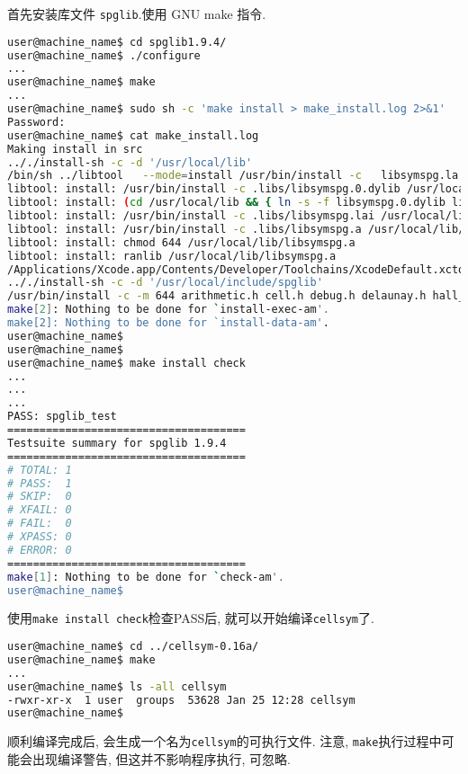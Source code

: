 \documentclass[a4paper, 10pt]{article}
\begin{document}
\begin{description}
首先安装库文件 \verb|spglib|.使用 GNU make 指令. 
\begin{lstlisting}[language={bash}]
user@machine_name$ cd spglib1.9.4/
user@machine_name$ ./configure
...
user@machine_name$ make
...
user@machine_name$ sudo sh -c 'make install > make_install.log 2>&1'
Password:
user@machine_name$ cat make_install.log 
Making install in src
.././install-sh -c -d '/usr/local/lib'
/bin/sh ../libtool   --mode=install /usr/bin/install -c   libsymspg.la '/usr/local/lib'
libtool: install: /usr/bin/install -c .libs/libsymspg.0.dylib /usr/local/lib/libsymspg.0.dylib
libtool: install: (cd /usr/local/lib && { ln -s -f libsymspg.0.dylib libsymspg.dylib || { rm -f libsymspg.dylib && ln -s libsymspg.0.dylib libsymspg.dylib; }; })
libtool: install: /usr/bin/install -c .libs/libsymspg.lai /usr/local/lib/libsymspg.la
libtool: install: /usr/bin/install -c .libs/libsymspg.a /usr/local/lib/libsymspg.a
libtool: install: chmod 644 /usr/local/lib/libsymspg.a
libtool: install: ranlib /usr/local/lib/libsymspg.a
/Applications/Xcode.app/Contents/Developer/Toolchains/XcodeDefault.xctoolchain/usr/bin/ranlib: file: /usr/local/lib/libsymspg.a(debug.o) has no symbols
.././install-sh -c -d '/usr/local/include/spglib'
/usr/bin/install -c -m 644 arithmetic.h cell.h debug.h delaunay.h hall_symbol.h kgrid.h kpoint.h mathfunc.h niggli.h pointgroup.h primitive.h refinement.h site_symmetry.h sitesym_database.h spacegroup.h spg_database.h spglib.h spin.h symmetry.h version.h '/usr/local/include/spglib'
make[2]: Nothing to be done for `install-exec-am'.
make[2]: Nothing to be done for `install-data-am'.
user@machine_name$
user@machine_name$
user@machine_name$ make install check
...
...
...
PASS: spglib_test
=====================================
Testsuite summary for spglib 1.9.4
=====================================
# TOTAL: 1
# PASS:  1
# SKIP:  0
# XFAIL: 0
# FAIL:  0
# XPASS: 0
# ERROR: 0
=====================================
make[1]: Nothing to be done for `check-am'.
user@machine_name$
\end{lstlisting}

使用\verb|make install check|检查PASS后, 就可以开始编译\verb|cellsym|了.
\begin{lstlisting}[language={bash}]
user@machine_name$ cd ../cellsym-0.16a/
user@machine_name$ make
...
user@machine_name$ ls -all cellsym
-rwxr-xr-x  1 user  groups  53628 Jan 25 12:28 cellsym
user@machine_name$ 
\end{lstlisting}

顺利编译完成后, 会生成一个名为\verb|cellsym|的可执行文件.
注意, \verb|make|执行过程中可能会出现编译警告, 但这并不影响程序执行, 可忽略.


\end{description}
\end{document}
